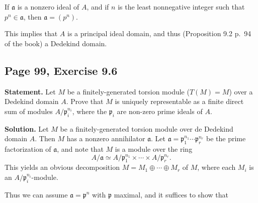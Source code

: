 \documentclass[parskip=half,fontsize=12pt]{scrartcl}%
\newcommand{\mf}{\mathfrak}
\newcommand{\aaa}{\mf a}
\newcommand{\mmm}{\mf m}
\newcommand{\ppp}{\mf p}
\newcommand{\epi}{\twoheadrightarrow}
\begin{document}
If $\aaa$ is a nonzero ideal of $A$, and if $n$ is the least nonnegative integer such that $p^n\in\aaa$, %
then $\aaa=(p^n)$. 

This implies that $A$ is a principal ideal domain, and thus (Proposition 9.2 p.~94 of the book) a Dedekind domain.





\subsection{Page 99, Exercise 9.6}%

\textbf{Statement.} Let $M$ be a finitely-generated torsion module ($T(M)=M$) over a Dedekind domain $A$. Prove that $M$ is uniquely representable as a finite direct sum of modules $A/\ppp_i^{n_i}$, where the $\ppp_i$ are non-zero prime ideals of $A$.

\textbf{Solution.} Let $M$ be a finitely-generated torsion module over de Dedekind domain $A$. Then $M$ has a nonzero annihilator $\aaa$. Let $\aaa=\ppp_1^{n_1}\cdots\ppp_r^{n_r}$ be the prime factorization of $\aaa$, and note that $M$ is a module over the ring 
$$
A/\aaa\simeq A/\ppp_1^{n_1}\times\cdots\times A/\ppp_r^{n_r}. 
$$ 
This yields an obvious decomposition $M=M_1\oplus\cdots\oplus M_r$ of $M$, where each $M_i$ is an $A/\ppp_i^{n_i}$-module. 

Thus we can assume $\aaa=\ppp^n$ with $\ppp$ maximal, and it suffices to show that 
\end{document}
